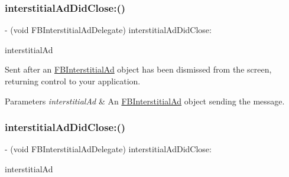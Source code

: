 \subsubsection{\texorpdfstring{interstitial\+Ad\+Did\+Close\+:()}{interstitialAdDidClose:()}\hspace{0.1cm}{\footnotesize\ttfamily [3/5]}}
{\footnotesize\ttfamily -\/ (void F\+B\+Interstitial\+Ad\+Delegate) interstitial\+Ad\+Did\+Close\+: \begin{DoxyParamCaption}\item[{(\hyperlink{interfaceFBInterstitialAd}{F\+B\+Interstitial\+Ad} $\ast$)}]{interstitial\+Ad }\end{DoxyParamCaption}\hspace{0.3cm}{\ttfamily [optional]}}

Sent after an \hyperlink{interfaceFBInterstitialAd}{F\+B\+Interstitial\+Ad} object has been dismissed from the screen, returning control to your application.


\begin{DoxyParams}{Parameters}
{\em interstitial\+Ad} & An \hyperlink{interfaceFBInterstitialAd}{F\+B\+Interstitial\+Ad} object sending the message. \\
\hline
\end{DoxyParams}
\mbox{\label{protocolFBInterstitialAdDelegate_01-p_a764df2f13294f6db329aad7e96b99da1}} 
\subsubsection{\texorpdfstring{interstitial\+Ad\+Did\+Close\+:()}{interstitialAdDidClose:()}\hspace{0.1cm}{\footnotesize\ttfamily [4/5]}}
{\footnotesize\ttfamily -\/ (void F\+B\+Interstitial\+Ad\+Delegate) interstitial\+Ad\+Did\+Close\+: \begin{DoxyParamCaption}\item[{(\hyperlink{interfaceFBInterstitialAd}{F\+B\+Interstitial\+Ad} $\ast$)}]{interstitial\+Ad }\end{DoxyParamCaption}\hspace{0.3cm}{\ttfamily [optional]}}

